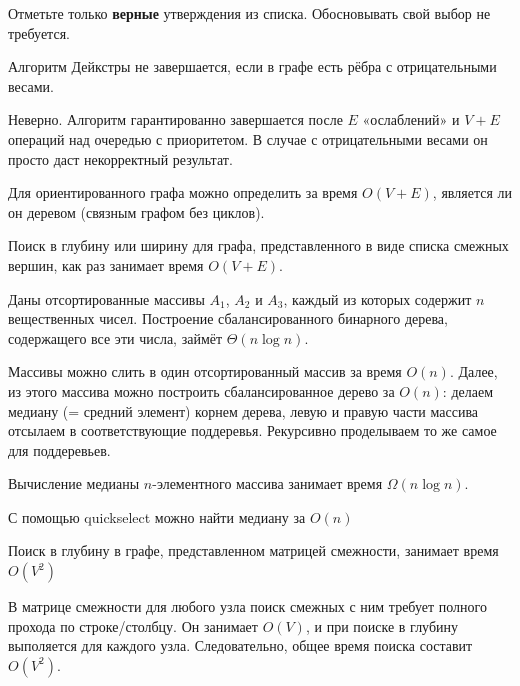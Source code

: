 \documentclass[12pt]{exam}
\begin{document}
\begin{questions}


\question[7] Отметьте только {\bf верные} утверждения из списка. Обосновывать свой выбор не требуется.
\begin{checkboxes}
    \choice Алгоритм Дейкстры не завершается, если в графе есть рёбра с отрицательными весами.
        \begin{solution}
        Неверно. Алгоритм гарантированно завершается после $E$ «ослаблений» и $V+E$ операций над очередью с приоритетом. В случае с отрицательными весами он просто даст некорректный результат.
        \end{solution}

    \CorrectChoice Для ориентированного графа можно определить за время $O(V + E)$, является ли он деревом (связным графом без циклов).
        \begin{solution}
        Поиск в глубину или ширину для графа, представленного в виде списка смежных вершин, как раз занимает время $O(V+E)$.
        \end{solution}

    \choice Даны отсортированные массивы $A_1$, $A_2$ и $A_3$, каждый из которых содержит $n$ вещественных чисел. Построение сбалансированного бинарного дерева, содержащего все эти числа, займёт $\Theta(n \log n)$.
        \begin{solution}
        Массивы можно слить в один отсортированный массив за время $O(n)$. Далее, из этого массива можно построить сбалансированное дерево за $O(n)$: делаем медиану (= средний элемент) корнем дерева, левую и правую части массива отсылаем в соответствующие поддеревья. Рекурсивно проделываем то же самое для поддеревьев.
        \end{solution}

    \choice Вычисление медианы $n$-элементного массива занимает время $\Omega(n \log n)$.
        \begin{solution}
        С помощью quickselect можно найти медиану за $O(n)$
        \end{solution}

    \CorrectChoice Поиск в глубину в графе, представленном матрицей смежности, занимает время $O(V^2)$
        \begin{solution}
        В матрице смежности для любого узла поиск смежных с ним требует полного прохода по строке/столбцу. Он занимает $O(V)$, и при поиске в глубину выполяется для каждого узла. Следовательно, общее время поиска составит $O(V^2)$.
        \end{solution}


\end{checkboxes}
\end{questions}
\end{document}

